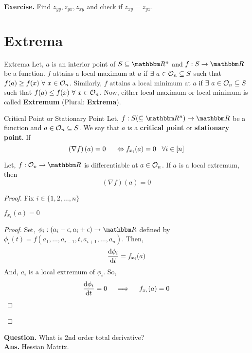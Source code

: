\documentclass[Analysis-3]{subfiles}
\begin{document}
\textbf{Exercise.} Find $z_{yy}, z_{yx}, z_{xy}$ and check if $z_{xy} = z_{yx}$.

\section{Extrema}

\begin{Def}{Extrema}{}
	Let, $a$ is an interior point of $S \subseteq \R^n$ and $f : S \to \R$ be a function. $f$ attains a local maximum at $a$ if $\exists\ a \in \mathcal{O}_{n} \subseteq S$ such that $f(a) \geq f(x)\ \forall\ x \in \mathcal{O}_{n}$. Similarly, $f$ attains a local minimum at $a$ if $\exists\ a \in \mathcal{O}_{n} \subseteq S$ such that $f(a) \leq f(x)\ \forall\ x \in \mathcal{O}_{n}$. Now, either local maximum or local minimum is called \textbf{Extremum} (Plural: \textbf{Extrema}).
\end{Def}

\begin{Def}{Critical Point or Stationary Point}{}
	Let, $f : S (\subseteq \R^n) \to \R$ be a function and $a \in \mathcal{O}_{n} \subseteq S$. We say that $a$ is a \textbf{critical point} or \textbf{stationary point}.
	If \[ \left(\nabla f\right)(a) = 0 \hspace{5mm} \Leftrightarrow f_{x_i}(a) = 0 \hspace{3mm} \forall i \in [n] \]
\end{Def}

\begin{Thm}{}{}
	Let, $f: \Op{n} \to \R$ is differentiable at $a \in \mathcal{O}_{n}$. If $a$ is a local extremum, then \[ \left(\nabla f\right)(a) = 0 \]
\end{Thm}

\begin{proof}
	Fix $i \in \{1,2, \ldots, n\}$

	\begin{clmBox}
		$f_{x_i}(a) = 0$
	\end{clmBox}

	\begin{proof}
		Set, $\phi_i : (a_i - \epsilon, a_i + \epsilon) \to \R$ defined by $\phi_i(t) = f(a_1, \ldots, a_{i-1}, t, a_{i+1}, \ldots, a_n)$. Then, \[ \dv{\phi_i}{t}(a_i) = f_{x_i}(a) \]
		And, $a_i$ is a local extremum of $\phi_i$. So, \[ \dv{\phi_i}{t}(a_i) = 0 \quad \implies \quad f_{x_i}(a) = 0 \]
	\end{proof}
\end{proof}


\textbf{Question.} What is 2nd order total derivative? \\
\textbf{Ans.} Hessian Matrix.
\end{document}
